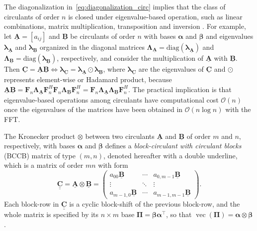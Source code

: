\documentclass[12pt]{article}
\newcommand{\mycirc}[1] {\underline{\bm{#1}}}
\newcommand{\mybcirc}[1] {\underline{\underline{\bm{#1}}}}
\begin{document}
The diagonalization in~\eqref{eq:diagonalization_circ} implies that the class of circulants of order $n$ is closed under eigenvalue-based operation, such as linear combinations, matrix multiplication, transposition and inversion \citep{Davis1979}.
For example, let $\mycirc{A} = [a_{ij}]$ and $\mycirc{B}$ be circulants of order $n$ with bases $\bm{\alpha}$ and $\bm{\beta}$ and eigenvalues $\bm{\lambda}_{\mycirc{A}}$ and $\bm{\lambda}_{\mycirc{B}}$ organized in the diagonal matrices $\bm{\Lambda}_{\mycirc{A}} = \mbox{diag}(\bm{\lambda}_{\mycirc{A}})$ and $\bm{\Lambda}_{\mycirc{B}} = \mbox{diag}(\bm{\lambda}_{\mycirc{B}})$, respectively, and consider the multiplication of $\mycirc{A}$ with $\mycirc{B}$. Then $\mycirc{C} = \mycirc{A}\mycirc{B} \iff \bm{\lambda}_{\mycirc{C}} = \bm{\lambda}_{\mycirc{A}} \odot \bm{\lambda}_{\mycirc{B}}$, where $\bm{\lambda}_{\mycirc{C}}$ are the eigenvalues of $\mycirc{C}$ and $\odot$ represents element-wise or Hadamard product, because
$\mycirc{A}\mycirc{B} = \bm{F}_n \bm{\Lambda}_{\mycirc{A}} \bm{F}_n^H \bm{F}_n \bm{\Lambda}_{\mycirc{B}} \bm{F}_n^H = \bm{F}_n \bm{\Lambda}_{\mycirc{A}} \bm{\Lambda}_{\mycirc{B}} \bm{F}_n^H$. 
The practical implication is that eigenvalue-based operations among circulants have computational cost $\mathcal{O}(n)$ once the eigenvalues of the matrices have been obtained in $\mathcal{O}(n \log n)$ with the FFT.


The Kronecker product $\otimes$ between two circulants $\mycirc{A}$ and $\mycirc{B}$ of order $m$ and $n$, respectively, with bases $\bm{\alpha}$ and $\bm{\beta}$ defines a \textit{block-circulant with circulant blocks} (BCCB) matrix of type $(m, n)$, denoted hereafter with a double underline, which is a matrix of order $mn$ with form
\begin{equation} \label{eq:kronecker_product}
\mybcirc{C} = \mycirc{A} \otimes \mycirc{B} = 
\begin{pmatrix}
a_{00} \mycirc{B} & \cdots & a_{0,m-1} \mycirc{B}\\ 
\vdots & \ddots & \vdots \\
a_{m-1,0} \mycirc{B} & \cdots & a_{m-1,m-1} \mycirc{B}
\end{pmatrix}.
\end{equation}
Each block-row in $\mybcirc{C}$ is a cyclic block-shift of the previous block-row, and the whole matrix is specified by its $n \times m$ base $\bm{\Pi}=\bm{\beta} \bm{\alpha}^{\top}$, so that $\operatorname{vec}(\bm{\Pi})=\bm{\alpha}\otimes\bm{\beta}$. 
\end{document}
